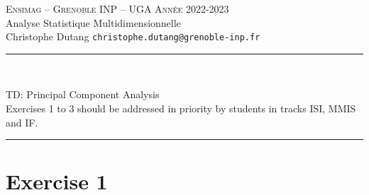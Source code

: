 \documentclass[
  11pt,
  a4paper,
]{article}
\author{}
\date{\vspace{-2.5em}}
\newcommand{\HRuleTop}{\noindent\rule{\linewidth}{.5pt}\vspace{-0.75em}}
\newcommand{\HRuleBottom}{\vspace{-1em}\rule{\linewidth}{.5pt}}
\newcommand{\sigle}{\textsc}
\begin{document}
\begin{flushleft}
\sigle{Ensimag -- Grenoble INP -- UGA} \hfill \sigle{Ann\'ee} 2022-2023 \\
Analyse Statistique Multidimensionnelle \\
Christophe Dutang   \hfill  \texttt{christophe.dutang@grenoble-inp.fr} \\


\HRuleTop\\
\begin{center}
\Large{TD: Principal Component Analysis}\\
\normalsize{Exercises 1 to 3 should be addressed in priority by students in tracks ISI, MMIS 
	and IF.}
\end{center}
\HRuleBottom
\end{flushleft}

\hypertarget{exercise-1}{%
\section{Exercise 1}\label{exercise-1}}
\end{document}
